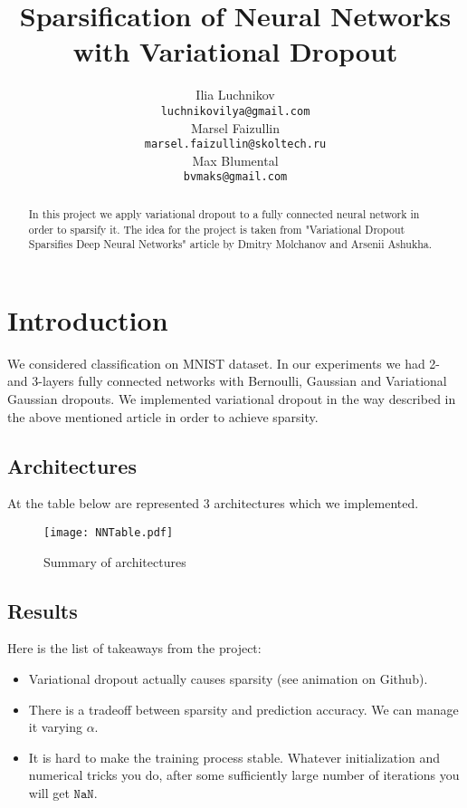 \documentclass{article}
\title{Sparsification of Neural Networks with Variational Dropout}
\author{
  Ilia Luchnikov\\
  \texttt{luchnikovilya@gmail.com} \\
   \And
 Marsel Faizullin \\
  \texttt{marsel.faizullin@skoltech.ru} \\
   \And
 Max Blumental \\
  \texttt{bvmaks@gmail.com} \\
}
\begin{document}
\maketitle

\begin{abstract}
In this project we apply variational dropout to a fully connected neural network in order to sparsify it. The idea for the project is taken from "Variational Dropout Sparsifies Deep Neural Networks" article by Dmitry Molchanov and Arsenii Ashukha.
\end{abstract}



\section{Introduction}
We considered classification on MNIST dataset. In our experiments we had 2- and 3-layers fully connected networks with Bernoulli, Gaussian and Variational Gaussian dropouts. We implemented variational dropout in the way described in the above mentioned article in order to achieve sparsity.

\subsection{Architectures}
At the table below are represented 3 architectures which we implemented.
\begin{figure}[h!]
    \centering
    \texttt{[image: NNTable.pdf]}
    \caption{Summary of architectures}
    \label{fig:my_label}
\end{figure}

\newpage


\subsection{Results}

Here is the list of takeaways from the project:

\begin{itemize}
    \item Variational dropout actually causes sparsity (see animation on Github).
    \item There is a tradeoff between sparsity and prediction accuracy. We can manage it varying $\alpha$.
    \item It is hard to make the training process stable. Whatever initialization and numerical tricks you do, after some sufficiently large number of iterations you will get $\texttt{NaN}$.
\end{itemize}
\end{document}

